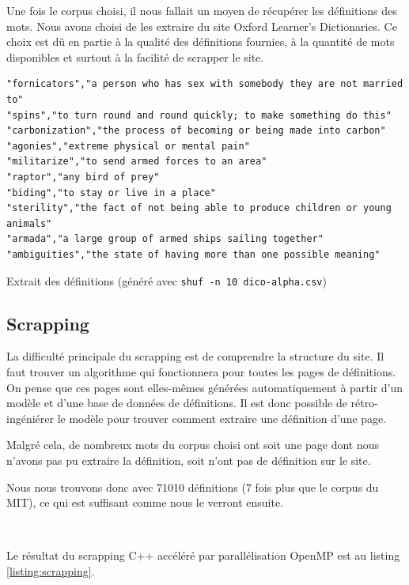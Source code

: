 \documentclass[french]{template}
\begin{document}
Une fois le corpus choisi, il nous fallait un moyen de récupérer les définitions des mots. Nous avons choisi de les extraire du site Oxford Learner's Dictionaries. Ce choix est dû en partie à la qualité des définitions fournies, à la quantité de mots disponibles et surtout à la facilité de scrapper le site.

\begin{listing}[H]
    \begin{verbatim}
"fornicators","a person who has sex with somebody they are not married to"
"spins","to turn round and round quickly; to make something do this"
"carbonization","the process of becoming or being made into carbon"
"agonies","extreme physical or mental pain"
"militarize","to send armed forces to an area"
"raptor","any bird of prey"
"biding","to stay or live in a place"
"sterility","the fact of not being able to produce children or young animals"
"armada","a large group of armed ships sailing together"
"ambiguities","the state of having more than one possible meaning"
\end{verbatim}
    \caption{Extrait des définitions (généré avec \texttt{shuf -n 10 dico-alpha.csv})}
    \label{listing:definitions}
\end{listing}

\subsection{Scrapping}

La difficulté principale du scrapping est de comprendre la structure du site. Il faut trouver un algorithme qui fonctionnera pour toutes les pages de définitions. On pense que ces pages sont elles-mêmes générées automatiquement à partir d'un modèle et d'une base de données de définitions. Il est donc possible de rétro-ingéniérer le modèle pour trouver comment extraire une définition d'une page.

Malgré cela, de nombreux mots du corpus choisi ont soit une page dont nous n'avons pas pu extraire la définition, soit n'ont pas de définition sur le site.

Nous nous trouvons donc avec 71010 définitions (7 fois plus que le corpus du MIT), ce qui est suffisant comme nous le verront ensuite.

\

Le résultat du scrapping C++ accéléré par parallélisation OpenMP est au listing \ref{listing:scrapping}.
\end{document}
